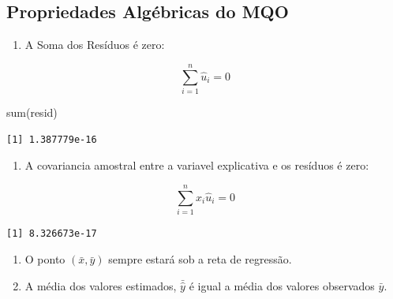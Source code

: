 \documentclass[
  letterpaper,
  DIV=11,
  numbers=noendperiod]{scrreprt}
\newenvironment{Shaded}{\begin{snugshade}}{\end{snugshade}}
\newcommand{\CommentTok}[1]{\textcolor[rgb]{0.37,0.37,0.37}{#1}}
\newcommand{\FunctionTok}[1]{\textcolor[rgb]{0.28,0.35,0.67}{#1}}
\newcommand{\NormalTok}[1]{\textcolor[rgb]{0.00,0.23,0.31}{#1}}
\newcommand{\OtherTok}[1]{\textcolor[rgb]{0.00,0.23,0.31}{#1}}
\newcommand{\SpecialCharTok}[1]{\textcolor[rgb]{0.37,0.37,0.37}{#1}}
\providecommand{\tightlist}{%
  \setlength{\itemsep}{0pt}\setlength{\parskip}{0pt}}
\begin{document}
\subsection{Propriedades Algébricas do
MQO}\label{propriedades-alguxe9bricas-do-mqo}

\begin{enumerate}
\def\labelenumi{(\arabic{enumi})}
\tightlist
\item
  A Soma dos Resíduos é zero:
\end{enumerate}

\[\sum_{i=1}^{n} \hat{u}_i = 0\]

\begin{Shaded}
\begin{Highlighting}[]
\FunctionTok{sum}\NormalTok{(resid)}
\end{Highlighting}
\end{Shaded}

\begin{verbatim}
[1] 1.387779e-16
\end{verbatim}

\begin{enumerate}
\def\labelenumi{(\arabic{enumi})}
\setcounter{enumi}{1}
\tightlist
\item
  A covariancia amostral entre a variavel explicativa e os resíduos é
  zero:
\end{enumerate}

\[\sum_{i=1}^{n} x_i \hat{u}_i = 0\]

\begin{Shaded}
\end{Shaded}

\begin{verbatim}
[1] 8.326673e-17
\end{verbatim}

\begin{enumerate}
\def\labelenumi{(\arabic{enumi})}
\setcounter{enumi}{2}
\item
  O ponto \((\bar{x},\bar{y})\) sempre estará sob a reta de regressão.
\item
  A média dos valores estimados, \(\bar{\hat{y}}\) é igual a média dos
  valores observados \(\bar{y}\).
\end{enumerate}
\end{document}
